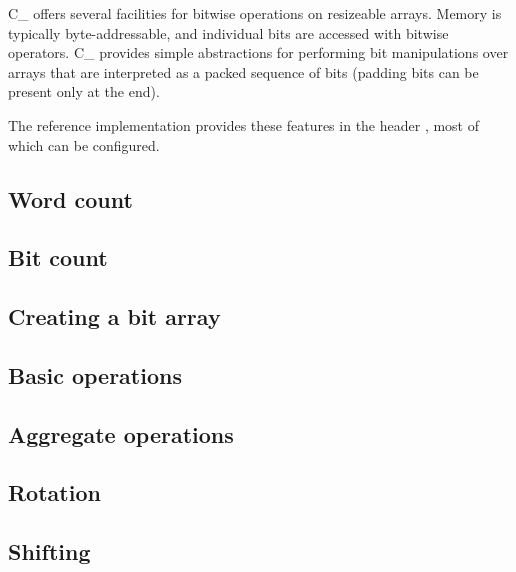 \def\Subsection#1{\subsection{#1}}

C\_ offers several facilities for bitwise operations on resizeable arrays.
Memory is typically byte-addressable,
and individual bits are accessed with bitwise operators.
C\_ provides simple abstractions for performing bit manipulations
over arrays that are interpreted as a packed sequence of bits
(padding bits can be present only at the end).

The reference implementation provides these features in
the header , most of which can be configured.

\subsection{}


\subsection{}


\Subsection{Word count}

\Subsection{Bit count}

\Subsection{Creating a bit array}

\Subsection{Basic operations}

\Subsection{Aggregate operations}

\Subsection{Rotation}

\Subsection{Shifting}
